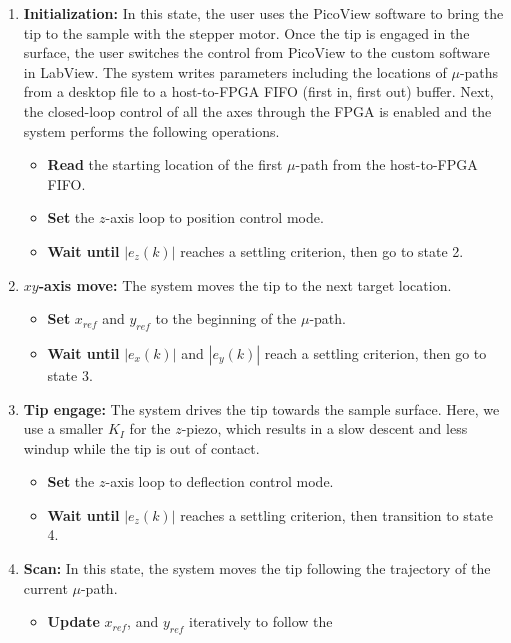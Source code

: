 \documentclass[twocolumn,twoside]{IEEEtran/IEEEtran}
\begin{document}
\begin{enumerate}
\item \textbf{Initialization:} In this state, the user uses the PicoView
  software to bring the tip to the sample with the stepper motor. Once the tip
  is engaged in the surface, the user switches the control from PicoView to the
  custom software in LabView. The system writes parameters including the
  locations of $\mu$-paths from a desktop file to a host-to-FPGA FIFO (first in,
  first out) buffer. Next, the closed-loop control of all the axes through the
  FPGA is enabled and the system performs the following operations.
  \begin{itemize}
  \item \textbf{Read} the starting location of the first $\mu$-path from the
    host-to-FPGA FIFO.
  \item \textbf{Set} the $z$-axis loop to position control mode.
  \item \textbf{Wait until} $|e_z(k)|$ reaches a settling criterion, then go to
    state 2.
  \end{itemize}
\item \textbf{$xy$-axis move:} The system moves the tip to the next target
  location.
  \begin{itemize}
  \item \textbf{Set} $x_{ref}$ and $y_{ref}$ to the beginning of the $\mu$-path.
  \item \textbf{Wait until} $|e_x(k)|$ and $|e_y(k)|$ reach a settling
    criterion, then go to state 3.
  \end{itemize}
\item \textbf{Tip engage:} The system drives the tip towards the sample surface.
  Here, we use a smaller $K_I$ for the $z$-piezo, which results in a slow
  descent and less windup while the tip is out of contact.
  \begin{itemize}
  \item \textbf{Set} the $z$-axis loop to deflection control mode.
  \item \textbf{Wait until} $|e_z(k)|$ reaches a settling criterion, then
    transition to state 4. 
  \end{itemize}
\item \textbf{Scan:} In this state, the system moves the tip following the
  trajectory of the current $\mu$-path.
  \begin{itemize}
  \item \textbf{Update} $x_{ref}$, and $y_{ref}$ iteratively to follow the

\end{itemize}
\end{enumerate}
\end{document}
